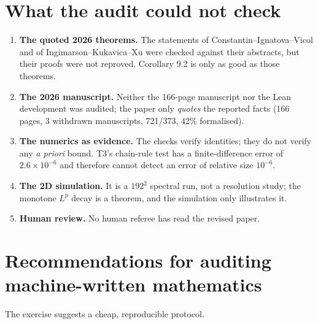 \documentclass[11pt,a4paper]{article}
\begin{document}
\section{What the audit could not check}

\begin{enumerate}[leftmargin=1.6em]
\item \textbf{The quoted 2026 theorems.} The statements of Constantin--Ignatova--Vicol and of
Ingimarson--Kukavica--Xu were checked against their abstracts, but their proofs were not
reproved. Corollary 9.2 is only as good as those theorems.
\item \textbf{The 2026 manuscript.} Neither the 166-page manuscript nor the Lean development was
audited; the paper only \emph{quotes} the reported facts (166 pages, 3 withdrawn manuscripts,
721/373, 42\% formalised).
\item \textbf{The numerics as evidence.} The checks verify identities; they do not verify any
\emph{a priori} bound. T3's chain-rule test has a finite-difference error of $2.6\times10^{-6}$
and therefore cannot detect an error of relative size $10^{-6}$.
\item \textbf{The 2D simulation.} It is a $192^2$ spectral run, not a resolution study; the
monotone $L^p$ decay is a theorem, and the simulation only illustrates it.
\item \textbf{Human review.} No human referee has read the revised paper.
\end{enumerate}

\section{Recommendations for auditing machine-written mathematics}

The exercise suggests a cheap, reproducible protocol.
\end{document}
